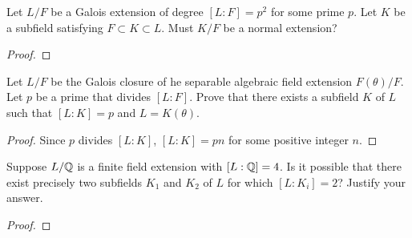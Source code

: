 \begin{problem}
Let $L/F$ be a Galois extension of degree $[L:F]=p^2$ for some prime
$p$. Let $K$ be a subfield satisfying $F\subset K\subset L$. Must $K/F$ be
a normal extension?
\end{problem}
\begin{proof}
\end{proof}

\begin{problem}
Let $L/F$ be the Galois closure of he separable algebraic field extension
$F(\theta)/F$. Let $p$ be a prime that divides $[L:F]$. Prove that there
exists a subfield $K$ of $L$ such that $[L:K]=p$ and $L=K(\theta)$.
\end{problem}
\begin{proof}
Since $p$ divides $[L:K]$, $[L:K]=pn$ for some positive integer
$n$.
\end{proof}
\begin{problem}
Suppose $L/\mathbb{Q}$ is a finite field extension with $[L:\mathbb{Q}]=4$. Is it
possible that there exist precisely two subfields $K_1$ and $K_2$ of $L$
for which $[L:K_i]=2$? Justify your answer.
\end{problem}
\begin{proof}
\end{proof}

